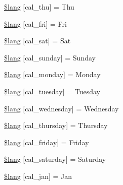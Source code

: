 \begin{DoxyCompactItemize}
\item 
\mbox{\hyperlink{calendar__lang_8php_a8e4a3a703cca8fa9b3ebb3fd78405eb9}{\$lang}} \mbox{[}\textquotesingle{}cal\+\_\+thu\textquotesingle{}\mbox{]} = \textquotesingle{}Thu\textquotesingle{}
\item 
\mbox{\hyperlink{calendar__lang_8php_a9b1c7be5fe2d30a11f163353a64c27aa}{\$lang}} \mbox{[}\textquotesingle{}cal\+\_\+fri\textquotesingle{}\mbox{]} = \textquotesingle{}Fri\textquotesingle{}
\item 
\mbox{\hyperlink{calendar__lang_8php_a605939391e56524991f15d2c05803f48}{\$lang}} \mbox{[}\textquotesingle{}cal\+\_\+sat\textquotesingle{}\mbox{]} = \textquotesingle{}Sat\textquotesingle{}
\item 
\mbox{\hyperlink{calendar__lang_8php_a6e603a253bd80f345ef2b0f379b2febb}{\$lang}} \mbox{[}\textquotesingle{}cal\+\_\+sunday\textquotesingle{}\mbox{]} = \textquotesingle{}Sunday\textquotesingle{}
\item 
\mbox{\hyperlink{calendar__lang_8php_abbfff77b914c0bf23419c97abe0a9023}{\$lang}} \mbox{[}\textquotesingle{}cal\+\_\+monday\textquotesingle{}\mbox{]} = \textquotesingle{}Monday\textquotesingle{}
\item 
\mbox{\hyperlink{calendar__lang_8php_add99c3523c9b2114d31410c23659a8a2}{\$lang}} \mbox{[}\textquotesingle{}cal\+\_\+tuesday\textquotesingle{}\mbox{]} = \textquotesingle{}Tuesday\textquotesingle{}
\item 
\mbox{\hyperlink{calendar__lang_8php_a6746b344cd9b8de8f4a87de321fb66b0}{\$lang}} \mbox{[}\textquotesingle{}cal\+\_\+wednesday\textquotesingle{}\mbox{]} = \textquotesingle{}Wednesday\textquotesingle{}
\item 
\mbox{\hyperlink{calendar__lang_8php_a9343f34c89f755cba1f323844c88bc60}{\$lang}} \mbox{[}\textquotesingle{}cal\+\_\+thursday\textquotesingle{}\mbox{]} = \textquotesingle{}Thursday\textquotesingle{}
\item 
\mbox{\hyperlink{calendar__lang_8php_a7440188074fc5e015fb10981196f66f1}{\$lang}} \mbox{[}\textquotesingle{}cal\+\_\+friday\textquotesingle{}\mbox{]} = \textquotesingle{}Friday\textquotesingle{}
\item 
\mbox{\hyperlink{calendar__lang_8php_aff18a3db9c4f62f90177e23cb1e72f4c}{\$lang}} \mbox{[}\textquotesingle{}cal\+\_\+saturday\textquotesingle{}\mbox{]} = \textquotesingle{}Saturday\textquotesingle{}
\item 
\mbox{\hyperlink{calendar__lang_8php_a53bfa59721f2467fae84b63b8f905459}{\$lang}} \mbox{[}\textquotesingle{}cal\+\_\+jan\textquotesingle{}\mbox{]} = \textquotesingle{}Jan\textquotesingle{}

\end{DoxyCompactItemize}
